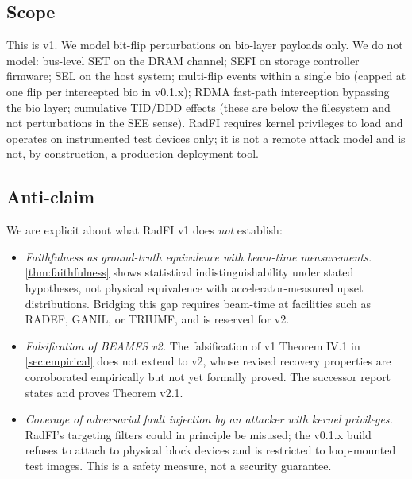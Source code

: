 \subsection{Scope}

This is v1. We model bit-flip perturbations on bio-layer payloads
only. We do not model: bus-level SET on the DRAM channel; SEFI on
storage controller firmware; SEL on the host system; multi-flip
events within a single bio (capped at one flip per intercepted bio
in v0.1.x); RDMA fast-path interception bypassing the bio layer;
cumulative TID/DDD effects (these are below the filesystem and not
perturbations in the SEE sense). RadFI requires kernel privileges to
load and operates on instrumented test devices only; it is not a
remote attack model and is not, by construction, a production
deployment tool.

\subsection{Anti-claim}

We are explicit about what RadFI v1 does \emph{not} establish:

\begin{itemize}
\item \emph{Faithfulness as ground-truth equivalence with beam-time
  measurements.} \cref{thm:faithfulness} shows statistical
  indistinguishability under stated hypotheses, not physical
  equivalence with accelerator-measured upset distributions.
  Bridging this gap requires beam-time at facilities such as RADEF,
  GANIL, or TRIUMF, and is reserved for v2.
\item \emph{Falsification of BEAMFS v2.} The falsification of v1
  Theorem IV.1 in \cref{sec:empirical} does not extend to v2, whose
  revised recovery properties are corroborated empirically but not
  yet formally proved. The successor
  report~\cite{desbrieres2026beamfsv2} states and proves
  Theorem v2.1.
\item \emph{Coverage of adversarial fault injection by an attacker
  with kernel privileges.} RadFI's targeting filters could in
  principle be misused; the v0.1.x build refuses to attach to
  physical block devices and is restricted to loop-mounted test
  images. This is a safety measure, not a security guarantee.
\end{itemize}
